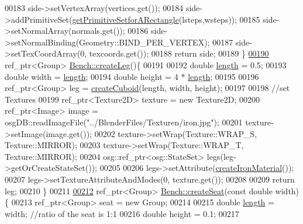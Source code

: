 \begin{DoxyCode}
00183         side->setVertexArray(vertices.get());
00184         side->addPrimitiveSet(\hyperlink{classbrtr_1_1_bench_a90c4ae616eb8d7bf669af2983ed3cd1d}{getPrimitiveSetforARectangle}(lsteps,wsteps));
00185         side->setNormalArray(normals.get());
00186         side->setNormalBinding(Geometry::BIND\_PER\_VERTEX);
00187         side->setTexCoordArray(0, texcoords.get());
00188         \textcolor{keywordflow}{return} side;
00189     \}
\hypertarget{_bench_8cpp_source_l00190}{}\hyperlink{classbrtr_1_1_bench_aefe5a9043a63e13d83c31a42046c6912}{00190}     ref\_ptr<Group> \hyperlink{classbrtr_1_1_bench_aefe5a9043a63e13d83c31a42046c6912}{Bench::createLeg}()\{
00191 
00192         \textcolor{keywordtype}{double} \hyperlink{classbrtr_1_1_bench_a81188a60871201d741c288396430964d}{length} = 0.5;
00193         \textcolor{keywordtype}{double} width = \hyperlink{classbrtr_1_1_bench_a81188a60871201d741c288396430964d}{length};
00194         \textcolor{keywordtype}{double} height = 4 * \hyperlink{classbrtr_1_1_bench_a81188a60871201d741c288396430964d}{length};
00195 
00196         ref\_ptr<Group> leg = \hyperlink{namespacebrtr_ae7f155c263aec9663a02763ed0bb882b}{createCuboid}(length, width, height);
00197 
00198         \textcolor{comment}{//set Textures}
00199         ref\_ptr<Texture2D> texture = \textcolor{keyword}{new} Texture2D;
00200         ref\_ptr<Image> image = osgDB::readImageFile(\textcolor{stringliteral}{"../BlenderFiles/Texturen/iron.jpg"});
00201         texture->setImage(image.get());
00202         texture->setWrap(Texture::WRAP\_S, Texture::MIRROR);
00203         texture->setWrap(Texture::WRAP\_T, Texture::MIRROR);
00204         osg::ref\_ptr<osg::StateSet> legs(leg->getOrCreateStateSet());
00205 
00206         legs->setAttribute(\hyperlink{classbrtr_1_1_bench_aafa199aa2218d57b290d99843a1443d4}{createIronMaterial}());
00207         legs->setTextureAttributeAndModes(0, texture.get());
00208 
00209         \textcolor{keywordflow}{return} leg;
00210     \}
00211 
\hypertarget{_bench_8cpp_source_l00212}{}\hyperlink{classbrtr_1_1_bench_a0547e73d10f329b2a9b4453b6319f472}{00212}     ref\_ptr<Group> \hyperlink{classbrtr_1_1_bench_a0547e73d10f329b2a9b4453b6319f472}{Bench::createSeat}(\textcolor{keyword}{const} \textcolor{keywordtype}{double} width)\{
00213         ref\_ptr<Group> seat = \textcolor{keyword}{new} Group;
00214 
00215         \textcolor{keywordtype}{double} \hyperlink{classbrtr_1_1_bench_a81188a60871201d741c288396430964d}{length} = width; \textcolor{comment}{//ratio of the seat is 1:1}
00216         \textcolor{keywordtype}{double} height = 0.1; 
00217 

\end{DoxyCode}
